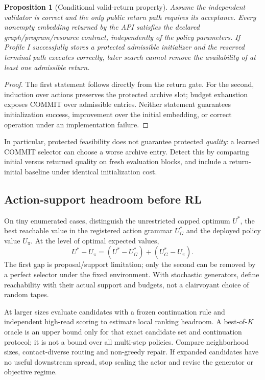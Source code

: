\documentclass[11pt,a4paper]{article}
\newtheorem{proposition}{Proposition}[section]
\theoremstyle{definition}\newtheorem{definition}[proposition]{Definition}
\begin{document}
\begin{proposition}[Conditional valid-return property]
Assume the independent validator is correct and the only public return path requires its acceptance. Every nonempty embedding returned by the API satisfies the declared graph/program/resource contract, independently of the policy parameters. If Profile I successfully stores a protected admissible initializer and the reserved terminal path executes correctly, later search cannot remove the availability of at least one admissible return.
\end{proposition}
\begin{proof}
The first statement follows directly from the return gate. For the second, induction over actions preserves the protected archive slot; budget exhaustion exposes COMMIT over admissible entries. Neither statement guarantees initialization success, improvement over the initial embedding, or correct operation under an implementation failure.
\end{proof}

In particular, protected feasibility does not guarantee protected \emph{quality}: a learned COMMIT selector can choose a worse archive entry. Detect this by comparing initial versus returned quality on fresh evaluation blocks, and include a return-initial baseline under identical initialization cost.

\subsection{Action-support headroom before RL}
On tiny enumerated cases, distinguish the unrestricted capped optimum $U^*$, the best reachable value in the registered action grammar $U_G^*$ and the deployed policy value $U_\pi$. At the level of optimal expected values,
\begin{equation}
U^*-U_\pi=(U^*-U_G^*)+(U_G^*-U_\pi).
\end{equation}
The first gap is proposal/support limitation; only the second can be removed by a perfect selector under the fixed environment. With stochastic generators, define reachability with their actual support and budgets, not a clairvoyant choice of random tapes.

At larger sizes evaluate candidates with a frozen continuation rule and independent high-read scoring to estimate local ranking headroom. A best-of-$K$ oracle is an upper bound only for that exact candidate set and continuation protocol; it is not a bound over all multi-step policies. Compare neighborhood sizes, contact-diverse routing and non-greedy repair. If expanded candidates have no useful downstream spread, stop scaling the actor and revise the generator or objective regime.
\end{document}
